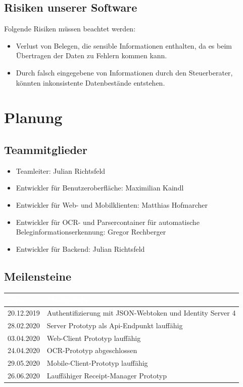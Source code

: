 \documentclass[12pt]{article}
\theoremstyle{definition}
\begin{document}
\subsection{Risiken unserer Software}

Folgende Risiken müssen beachtet werden:
\begin{itemize}
\item Verlust von Belegen, die sensible Informationen enthalten, da es beim Übertragen der Daten zu Fehlern kommen kann.
\item Durch falsch eingegebene von Informationen durch den Steuerberater, könnten inkonsistente Datenbestände entstehen.
\end{itemize}

\pagebreak

\section{Planung}

\subsection{Teammitglieder}

\begin{itemize}
\item Teamleiter: Julian Richtsfeld
\item Entwickler für Benutzeroberfläche: Maximilian Kaindl
\item Entwickler für Web- und Mobilklienten: Matthias Hofmarcher
\item Entwickler für OCR- und Parsercontainer für automatische Beleginformationserkennung: Gregor Rechberger
\item Entwickler für Backend: Julian Richtsfeld
\end{itemize}

\subsection{Meilensteine}

\begin{tabular}{|l|l|}
\hline
\cellcolor[gray]{0.5}\textcolor{white}{Date} & \cellcolor[gray]{0.5}\textcolor{white}{Meilenstein} \\ \hline
20.12.2019&Authentifizierung mit JSON-Webtoken und Identity Server 4\\ \hline
28.02.2020&Server Prototyp als Api-Endpunkt lauffähig \\ \hline
03.04.2020&Web-Client Prototyp lauffähig \\ \hline
24.04.2020&OCR-Prototyp abgeschlossen \\ \hline
29.05.2020&Mobile-Client-Prototyp lauffähig\\ \hline
26.06.2020&Lauffähiger Receipt-Manager Prototyp\\ \hline
\end{tabular}
\end{document}
